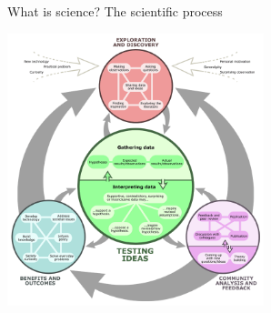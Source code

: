 \documentclass[t]{beamer}
\begin{document}
\begin{ftst}
{What is science?}
{The scientific process}
\begin{center}
	\vspace{-1.3em}
	\includegraphics[width=0.56\textwidth]{../figs/sciproc02.png}
\end{center}
\end{ftst}

\end{document}

